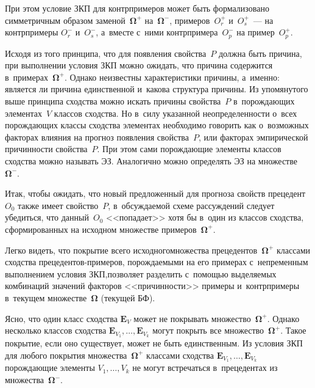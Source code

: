 \begin{multicols}{2}
\noindent 
  При этом условие ЗКП для контрпримеров может быть формализовано 
симметричным образом заменой~$\boldsymbol{\Omega}^+$ 
на~$\boldsymbol{\Omega}^-$, примеров~$O_r^+$ и~$O_s^+$~--- на контрпримеры 
$O_r^-$ и~$O_s^-$, а~вместе с~ними контрпримера~$O_p^-$ на пример~$O_p^+$. 
  
  Исходя из того принципа, что для появления свойства~$P$ должна быть 
причина, при выполнении условия ЗКП можно ожидать, что причина содержится 
в~примерах~$\boldsymbol{\Omega}^+$. Однако неизвестны характеристики 
причины, а~именно: является ли причина единственной и~какова структура 
причины. Из упомянутого выше принципа сходства можно искать причины 
свойства~$P$ в~по\-рож\-да\-ющих элементах~$V$ классов сходства. Но в~силу 
указанной неопределенности о~всех порождающих классы сходства элементах 
необходимо говорить как о~возможных факторах влияния на прогноз появления 
свойства~$P$, или факторах эмпирической причинности свойства~$P$. При этом 
сами порождающие элементы классов сходства можно называть ЭЗ. Аналогично 
можно определять ЭЗ на множестве~$\boldsymbol{\Omega}^-$. 
  
  Итак, чтобы ожидать, что новый предложенный для прогноза свойств 
прецедент~$O_0$ также имеет свойство~$P$, в~обсуждаемой схеме рассуждений 
следует убедиться, что данный~$O_0$ <<попадает>> хотя бы в~один из классов 
сходства, сформированных на исходном множестве 
примеров~$\boldsymbol{\Omega}^+$.
  
  Легко видеть, что покрытие всего исходного\linebreak множества 
прецедентов~$\boldsymbol{\Omega}^+$ классами сходства  
пре\-це\-ден\-тов-при\-ме\-ров, порождаемыми на его примерах с~непременным 
выполнением условия ЗКП,\linebreak позволяет разделить с~по\-мощью выделяемых 
комбинаций значений факторов <<причинности>> примеры и~контрпримеры 
в~текущем множестве~$\boldsymbol{\Omega}$ (текущей БФ). 
  
  Ясно, что один класс сходства $\mathbf{E}_V$ может не покрывать 
множество~$\boldsymbol{\Omega}^+$. Однако несколько классов сходства 
$\mathbf{E}_{V_1},\ldots , \mathbf{E}_{V_k}$ могут покрыть все 
множество~$\boldsymbol{\Omega}^+$. Такое покрытие, если оно существует, 
может не быть единственным. Из условия ЗКП для любого покрытия 
множества~$\boldsymbol{\Omega}^+$ классами сходства 
$\mathbf{E}_{V_1},\ldots , \mathbf{E}_{V_k}$ порождающие элементы 
$V_1,\ldots , V_k$ не могут встречаться в~прецедентах из 
множества~$\boldsymbol{\Omega}^-$. 
  

\end{multicols}
